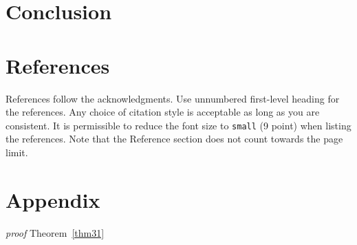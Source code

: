 \documentclass{article}
\begin{document}
{\section{Conclusion}
\label{s5}




\section*{References}


References follow the acknowledgments. Use unnumbered first-level heading for
the references. Any choice of citation style is acceptable as long as you are
consistent. It is permissible to reduce the font size to \verb+small+ (9 point)
when listing the references.
Note that the Reference section does not count towards the page limit.
\medskip


{\small{}

}{\small\par}




\appendix


\section{Appendix}
\textit{proof} Theorem~\ref{thm31}

}
\end{document}
